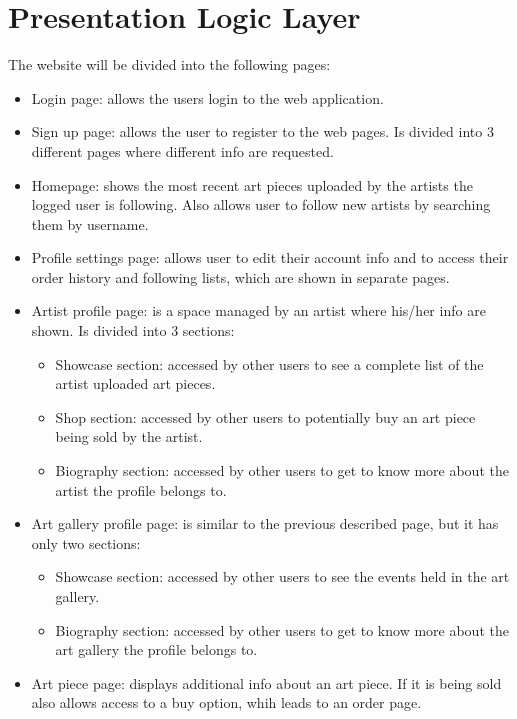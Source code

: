\section{Presentation Logic Layer}


The website will be divided into the following pages:
\begin{itemize}
    \item Login page: allows the users login to the web application.
    \item Sign up page: allows the user to register to the web pages. Is divided into 3 different pages where different
    info are requested.
    \item Homepage: shows the most recent art pieces uploaded by the artists the logged user is following. Also 
    allows user to follow new artists by searching them by username.
    \item Profile settings page: allows user to edit their account info and to access their order history and following 
    lists, which are shown in separate pages.
    \item Artist profile page: is a space managed by an artist where his/her info are shown. Is divided into 3 sections:
    \begin{itemize}
        \item Showcase section: accessed by other users to see a complete list of the artist uploaded art pieces.
        \item Shop section: accessed by other users to potentially buy an art piece being sold by the artist.
        \item Biography section: accessed by other users to get to know more about the artist the profile belongs to.
    \end{itemize}
    \item Art gallery profile page: is similar to the previous described page, but it has only two sections:
    \begin{itemize}
        \item Showcase section: accessed by other users to see the events held in the art gallery.
        \item Biography section: accessed by other users to get to know more about the art gallery the profile belongs 
        to.
    \end{itemize}
    \item Art piece page: displays additional info about an art piece. If it is being sold also allows access to a buy 
    option, whih leads to an order page.
\end{itemize}
